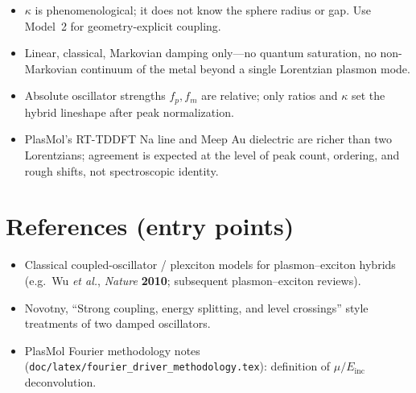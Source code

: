 \documentclass[11pt,a4paper]{article}
\begin{document}
\begin{itemize}[leftmargin=1.4em]
  \item $\kappa$ is phenomenological; it does not know the sphere radius
        or gap.  Use Model~2 for geometry-explicit coupling.
  \item Linear, classical, Markovian damping only---no quantum saturation,
        no non-Markovian continuum of the metal beyond a single Lorentzian
        plasmon mode.
  \item Absolute oscillator strengths $f_p,f_m$ are relative; only ratios
        and $\kappa$ set the hybrid lineshape after peak normalization.
  \item PlasMol's RT-TDDFT Na line and Meep Au dielectric are richer than
        two Lorentzians; agreement is expected at the level of peak count,
        ordering, and rough shifts, not spectroscopic identity.
\end{itemize}

\section{References (entry points)}

\begin{itemize}[leftmargin=1.4em]
  \item Classical coupled-oscillator / plexciton models for
        plasmon--exciton hybrids (e.g.\ Wu \emph{et al.}, \emph{Nature}
        \textbf{2010}; subsequent plasmon--exciton reviews).
  \item Novotny, ``Strong coupling, energy splitting, and level crossings''
        style treatments of two damped oscillators.
  \item PlasMol Fourier methodology notes
        (\texttt{doc/latex/fourier\_driver\_methodology.tex}): definition
        of $\mu/E_{\mathrm{inc}}$ deconvolution.
\end{itemize}
\end{document}
